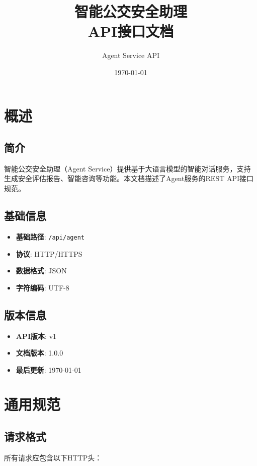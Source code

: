 \documentclass[12pt,a4paper]{article}
\title{智能公交安全助理\\API接口文档}
\author{Agent Service API}
\date{\today}
\begin{document}
\maketitle
\tableofcontents
\newpage

\section{概述}

\subsection{简介}

智能公交安全助理（Agent Service）提供基于大语言模型的智能对话服务，支持生成安全评估报告、智能咨询等功能。本文档描述了Agent服务的REST API接口规范。

\subsection{基础信息}

\begin{itemize}
  \item \textbf{基础路径}: \texttt{/api/agent}
  \item \textbf{协议}: HTTP/HTTPS
  \item \textbf{数据格式}: JSON
  \item \textbf{字符编码}: UTF-8
\end{itemize}

\subsection{版本信息}

\begin{itemize}
  \item \textbf{API版本}: v1
  \item \textbf{文档版本}: 1.0.0
  \item \textbf{最后更新}: \today
\end{itemize}

\section{通用规范}

\subsection{请求格式}

所有请求应包含以下HTTP头：
\end{document}
